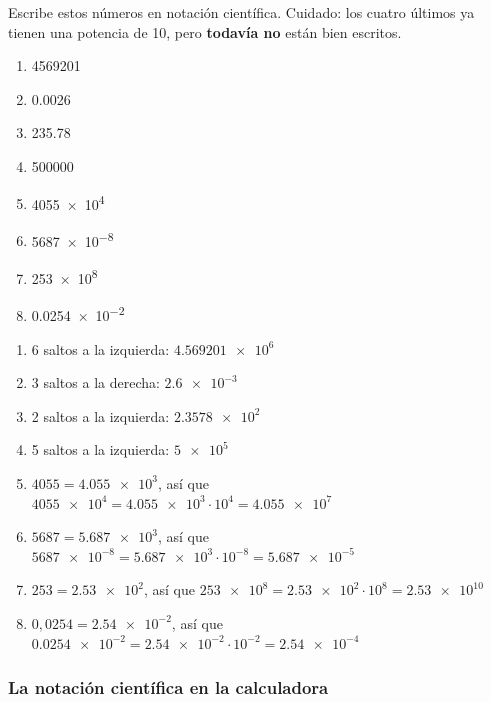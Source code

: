 \begin{exercise}
    Escribe estos números en notación científica. Cuidado: los cuatro últimos ya tienen una potencia de 10, pero \textbf{todavía no} están bien escritos.
    \begin{enumerate}[label=\letraminuscula]
        \item \num{4569201}
        \item \num{0.0026}
        \item \num{235.78}
        \item \num{500000}
        \item \num{4055e4}
        \item \num{5687e-8}
        \item \num{253e8}
        \item \num{0.0254e-2}
    \end{enumerate}
    \begin{solu}
        \begin{enumerate}[label=\alph*)]
            \item 6 saltos a la izquierda: \(\num{4.569201e6}\)
            \item 3 saltos a la derecha: \(\num{2.6e-3}\)
            \item 2 saltos a la izquierda: \(\num{2.3578e2}\)
            \item 5 saltos a la izquierda: \(\num{5e5}\)
            \item \(4055 = \num{4.055e3}\), así que \(\num{4055e4} = \num{4.055e3} \cdot 10^{4} = \num{4.055e7}\)
            \item \(5687 = \num{5.687e3}\), así que \(\num{5687e-8} = \num{5.687e3} \cdot 10^{-8} = \num{5.687e-5}\)
            \item \(253 = \num{2.53e2}\), así que \(\num{253e8} = \num{2.53e2} \cdot 10^{8} = \num{2.53e10}\)
            \item \(0{,}0254 = \num{2.54e-2}\), así que \(\num{0.0254e-2} = \num{2.54e-2} \cdot 10^{-2} = \num{2.54e-4}\)
        \end{enumerate}
    \end{solu}
\end{exercise}


\subsubsection{La notación científica en la calculadora}

